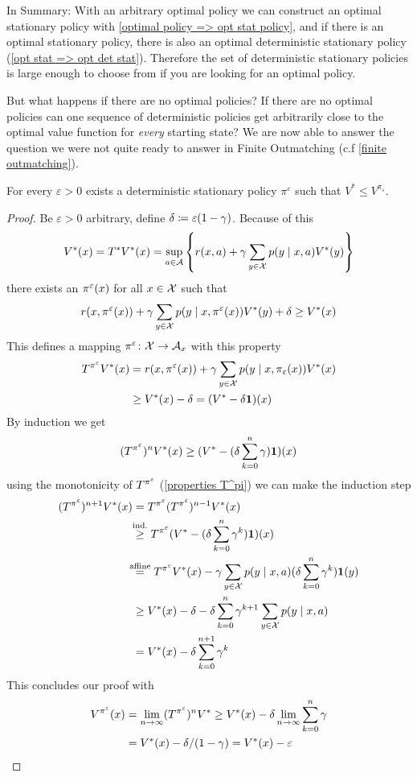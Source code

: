 In Summary: With an arbitrary optimal policy we can construct an optimal stationary policy with \ref{optimal policy => opt stat policy}, and if there is an optimal stationary policy, there is also an optimal deterministic stationary policy (\ref{opt stat => opt det stat}). Therefore the set of deterministic stationary policies is large enough to choose from if you are looking for an optimal policy. 

But what happens if there are no optimal policies? If there are no optimal policies can one sequence of deterministic policies get arbitrarily close to the optimal value function for \emph{every} starting state? We are now able to answer the question we were not quite ready to answer in Finite Outmatching   (c.f \ref{finite outmatching}).

\begin{prop}\label{epsilon optimal}
	For every \(\varepsilon>0\) exists a deterministic stationary policy \(\pi^\varepsilon\) such that \(V^* \le V^{\pi_\varepsilon} \).
\end{prop}
\begin{proof}
	Be \(\varepsilon>0 \) arbitrary,  define \(\delta\coloneqq \varepsilon (1-\gamma) \). Because of this
	\[
		V^*(x)=T^*V^*(x)=\sup_{a\in\mathcal{A}}
		\left\{r(x,a)+\gamma\sum_{y\in\mathcal{X}}p(y\mid x,a)V^*(y) \right\}
	\]
	there exists an \(\pi^\varepsilon(x)\) for all \(x\in\mathcal{X}\) such that
	\begin{align}\label{epsilon optimal policy}
		r(x,\pi^\varepsilon(x))+\gamma\sum_{y\in\mathcal{X}}p(y\mid x,\pi^\varepsilon(x))V^*(y) + \delta \ge V^*(x)
	\end{align}
	This defines a mapping \(\pi^\varepsilon\colon \mathcal{X}\to\mathcal{A}_x\) with this property
	\begin{align*}
		T^{\pi^\varepsilon} V^*(x)
		&=r(x,\pi^\varepsilon(x))+\gamma \sum_{y\in\mathcal{X}}p(y\mid x,\pi_\varepsilon(x)) V^*(x)\\
		&\ge V^*(x) -\delta = (V^* -\delta \mathbf{1}) (x)
	\end{align*}
	By induction we get 
	\[
		(T^{\pi^\varepsilon})^n V^*(x)\ge (V^*-(\delta\sum_{k=0}^n\gamma) \mathbf{1}) (x)
	\] 
	using the monotonicity of \(T^{\pi^\varepsilon}\) (\ref{properties T^pi}) we can make the induction step
	\begin{align*}
		(T^{\pi^\vep})^{n+1} V^*(x)
		&=T^{\pi^\vep} (T^{\pi^\vep})^{n-1} V^*(x)\\
		&\lxgq{\text{ind.}} T^{\pi^\vep} (V^*-(\delta\sum_{k=0}^n\gamma^k) \mathbf{1})(x)\\
		&\lxeq{\text{affine}} T^{\pi^\vep} V^*(x) - \gamma \sum_{y\in\cX} p(y\mid x, a) (\delta\sum_{k=0}^n\gamma^k) \mathbf{1}(y)\\
		&\ge V^*(x)-\delta - \delta\sum_{k=0}^n\gamma^{k+1} \sum_{y\in\cX} p(y\mid x,a)\\
		&=V^*(x)-\delta \sum_{k=0}^{n+1}\gamma^k
	\end{align*}
	This concludes our proof with
	\begin{align*}
		V^{\pi^\varepsilon}(x)&=\lim_{n\to\infty} (T^{\pi^\varepsilon})^n V^* 
		\ge V^*(x)-\delta\lim_{n\to\infty}\sum_{k=0}^n\gamma\\
		&=V^*(x)-\delta/(1-\gamma)=V^*(x)-\varepsilon \qedhere
	\end{align*}
\end{proof}

